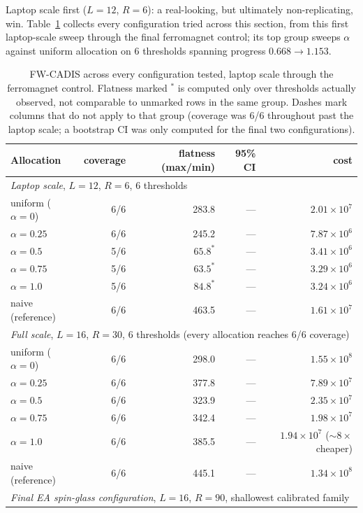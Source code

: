 \documentclass[a4paper,fleqn]{cas-sc}
\begin{document}
Laptop scale first ($L=12$, $R=6$): a real-looking, but ultimately non-replicating,
	win. Table~\ref{tab:fwall} collects every configuration tried across this section, from
this first laptop-scale sweep through the final ferromagnet control; its top group sweeps
$\alpha$ against uniform allocation on 6 thresholds spanning progress $0.668\to1.153$.

\begin{table}[H]
\centering\small
\caption{FW-CADIS across every configuration tested, laptop scale through the ferromagnet
	control. Flatness marked $^*$ is computed only over thresholds actually observed, not
	comparable to unmarked rows in the same group. Dashes mark columns that do not apply to
	that group (coverage was 6/6 throughout past the laptop scale; a bootstrap CI was only
	computed for the final two configurations).}
\label{tab:fwall}
\begin{tabular}{lrrrr}
	\toprule
	Allocation & coverage & flatness (max/min) & 95\% CI & cost \\
	\midrule
	\multicolumn{5}{l}{\emph{Laptop scale}, $L=12$, $R=6$, 6 thresholds} \\
	uniform ($\alpha=0$) & 6/6 & 283.8 & --- & $2.01\times10^{7}$ \\
	$\alpha=0.25$ & 6/6 & 245.2 & --- & $7.87\times10^{6}$ \\
	$\alpha=0.5$ & 5/6 & $65.8^*$ & --- & $3.41\times10^{6}$ \\
	$\alpha=0.75$ & 5/6 & $63.5^*$ & --- & $3.29\times10^{6}$ \\
	$\alpha=1.0$ & 5/6 & $84.8^*$ & --- & $3.24\times10^{6}$ \\
	naive (reference) & 6/6 & 463.5 & --- & $1.61\times10^{7}$ \\
	\multicolumn{5}{l}{\emph{Full scale}, $L=16$, $R=30$, 6 thresholds (every allocation reaches 6/6 coverage)} \\
	uniform ($\alpha=0$) & 6/6 & 298.0 & --- & $1.55\times10^{8}$ \\
	$\alpha=0.25$ & 6/6 & 377.8 & --- & $7.89\times10^{7}$ \\
	$\alpha=0.5$ & 6/6 & 323.9 & --- & $2.35\times10^{7}$ \\
	$\alpha=0.75$ & 6/6 & 342.4 & --- & $1.98\times10^{7}$ \\
	$\alpha=1.0$ & 6/6 & 385.5 & --- & $1.94\times10^{7}$ ($\sim\!8\times$ cheaper) \\
	naive (reference) & 6/6 & 445.1 & --- & $1.34\times10^{8}$ \\
	\multicolumn{5}{l}{\emph{Final EA spin-glass configuration}, $L=16$, $R=90$, shallowest calibrated family} \\

\end{tabular}
\end{table}
\end{document}

